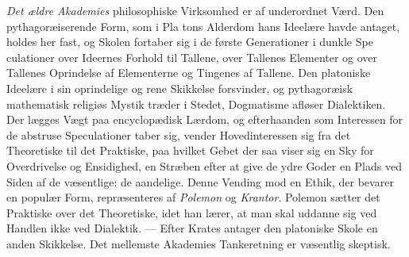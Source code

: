 \documentclass[12pt,a4paper]{book}
\begin{document}
\emph{Det ældre Akademies} philosophiske Virksomhed er af
underordnet Værd. Den pythagoræiserende Form, som i Pla\-%
tons Alderdom hans Ideelære havde antaget, holdes her fast,
og Skolen fortaber sig i de første Generationer i dunkle Spe\-%
culationer over Ideernes Forhold til Tallene, over Tallenes
Elementer og over Tallenes Oprindelse af Elementerne og
Tingenes af Tallene. Den platoniske Ideelære i sin oprindelige
og rene Skikkelse forsvinder, og pythagoræisk mathematisk\-%
religiøs Mystik træder i Stedet, Dogmatisme afløser Dialektiken.
Der lægges Vægt paa encyclopædisk Lærdom, og efterhaanden
som Interessen for de abstruse Speculationer taber sig, vender
Hovedinteressen sig fra det Theoretiske til det Praktiske, paa
hvilket Gebet der saa viser sig en Sky for Overdrivelse og
Ensidighed, en Stræben efter at give de ydre Goder en Plads
ved Siden af de væsentlige: de aandelige. Denne Vending
mod en Ethik, der bevarer en populær Form, repræsenteres af
\emph{Polemon} og \emph{Krantor}. Polemon sætter det Praktiske over
det Theoretiske, idet han lærer, at man skal uddanne sig ved
Handlen ikke ved Dialektik. --- Efter Krates antager den
platoniske Skole en anden Skikkelse. Det mellemste Akademies
Tankeretning er væsentlig skeptisk.
\end{document}
